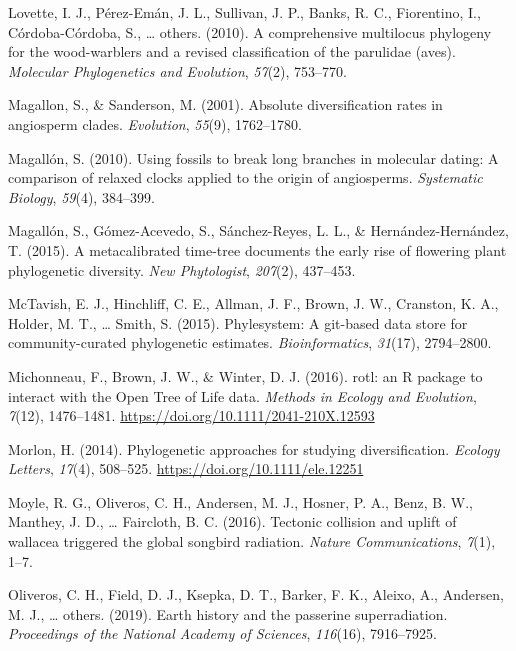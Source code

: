 \documentclass[english,man]{apa6}
\begin{document}
\leavevmode\hypertarget{ref-lovette2010comprehensive}{}%
Lovette, I. J., Pérez-Emán, J. L., Sullivan, J. P., Banks, R. C., Fiorentino, I., Córdoba-Córdoba, S., \ldots{} others. (2010). A comprehensive multilocus phylogeny for the wood-warblers and a revised classification of the parulidae (aves). \emph{Molecular Phylogenetics and Evolution}, \emph{57}(2), 753--770.

\leavevmode\hypertarget{ref-magallon2001absolute}{}%
Magallon, S., \& Sanderson, M. (2001). Absolute diversification rates in angiosperm clades. \emph{Evolution}, \emph{55}(9), 1762--1780.

\leavevmode\hypertarget{ref-magallon2010using}{}%
Magallón, S. (2010). Using fossils to break long branches in molecular dating: A comparison of relaxed clocks applied to the origin of angiosperms. \emph{Systematic Biology}, \emph{59}(4), 384--399.

\leavevmode\hypertarget{ref-magallon2015metacalibrated}{}%
Magallón, S., Gómez-Acevedo, S., Sánchez-Reyes, L. L., \& Hernández-Hernández, T. (2015). A metacalibrated time-tree documents the early rise of flowering plant phylogenetic diversity. \emph{New Phytologist}, \emph{207}(2), 437--453.

\leavevmode\hypertarget{ref-mctavish2015phylesystem}{}%
McTavish, E. J., Hinchliff, C. E., Allman, J. F., Brown, J. W., Cranston, K. A., Holder, M. T., \ldots{} Smith, S. (2015). Phylesystem: A git-based data store for community-curated phylogenetic estimates. \emph{Bioinformatics}, \emph{31}(17), 2794--2800.

\leavevmode\hypertarget{ref-Michonneau2016}{}%
Michonneau, F., Brown, J. W., \& Winter, D. J. (2016). rotl: an R package to interact with the Open Tree of Life data. \emph{Methods in Ecology and Evolution}, \emph{7}(12), 1476--1481. \url{https://doi.org/10.1111/2041-210X.12593}

\leavevmode\hypertarget{ref-Morlon2014}{}%
Morlon, H. (2014). Phylogenetic approaches for studying diversification. \emph{Ecology Letters}, \emph{17}(4), 508--525. \url{https://doi.org/10.1111/ele.12251}

\leavevmode\hypertarget{ref-moyle2016tectonic}{}%
Moyle, R. G., Oliveros, C. H., Andersen, M. J., Hosner, P. A., Benz, B. W., Manthey, J. D., \ldots{} Faircloth, B. C. (2016). Tectonic collision and uplift of wallacea triggered the global songbird radiation. \emph{Nature Communications}, \emph{7}(1), 1--7.

\leavevmode\hypertarget{ref-oliveros2019earth}{}%
Oliveros, C. H., Field, D. J., Ksepka, D. T., Barker, F. K., Aleixo, A., Andersen, M. J., \ldots{} others. (2019). Earth history and the passerine superradiation. \emph{Proceedings of the National Academy of Sciences}, \emph{116}(16), 7916--7925.
\end{document}
